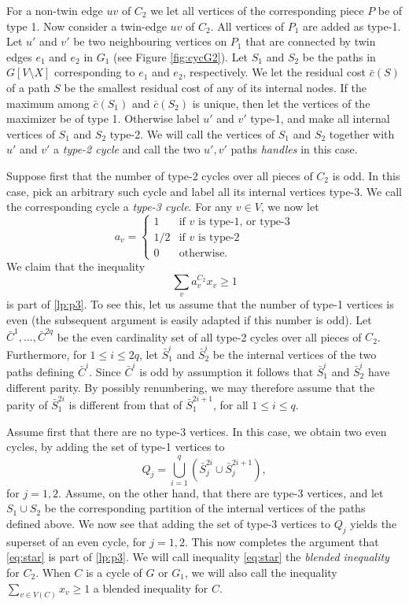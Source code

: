 \documentclass{article}
\newcommand{\0}{\mathbb{0}}
\newcommand{\1}{\mathbb{1}}
\begin{document}
For a non-twin edge
$uv$ of $C_2$ we let all vertices of the corresponding piece $P$ be of type 1. 
Now consider a twin-edge $uv$ of $C_2$. All vertices of $P_1$ are added as type-1. 
Let $u'$ and $v'$ be two neighbouring vertices on $P_1$ that are connected by twin edges 
$e_1$ and $e_2$ in $G_1$ (see Figure \ref{fig:cycG2}). 
Let $S_1$ and
$S_2$ be the paths in $G[V\setminus X]$ corresponding to $e_1$ and
$e_2$, respectively. We let the residual cost $\bar{c}(S)$ of a path $S$ be the
smallest residual cost of any of its internal nodes. 
If the maximum among $\bar{c}(S_1)$ and $\bar{c}(S_2)$ is unique, then let the vertices
of the maximizer be of type 1. Otherwise label $u'$ and $v'$ type-1, and make all internal
vertices of $S_1$ and $S_2$ type-2. We will call the vertices of $S_1$ and $S_2$ together
with $u'$ and $v'$ a {\em type-2 cycle} and call the two $u',v'$ paths \emph{handles} \cite{FJP10} in this case. %

Suppose first that the number of type-2 cycles over all pieces of $C_2$ is
odd. In this case, pick an arbitrary such cycle and label all its internal
vertices type-3. We call the corresponding cycle a {\em type-3 cycle}. For any
$v \in V$, we now let
\[
  a_v = \begin{cases} 
    1 & \mbox{if $v$ is type-1, or type-3}\\
    1/2 & \mbox{if $v$ is type-2}\\
    0 & \mbox{otherwise.}  
    \end{cases}
\]
We claim that the inequality
\begin{equation}\tag{$\circledast$}\label{eq:star} 
  \sum_v a_v^{C_2} x_v \geq 1 
\end{equation}
is part of \eqref{lp:p3}. To see this, let us assume that the number of type-1
vertices is even (the subsequent argument is easily adapted if this number is
odd). Let $\bar{C}^1, \ldots, \bar{C}^{2q}$ be the even cardinality set of all
type-2 cycles over all pieces of $C_2$. Furthermore, for $1 \leq i \leq 2q$,
let $ \bar{S}^i_1$ and $\bar{S}^i_2$ be the internal vertices of the two paths
defining $\bar{C}^i$. Since $\bar{C}^i$ is odd by assumption it follows that
$\bar{S}^i_1$ and $\bar{S}^i_2$ have different parity. By possibly
renumbering, we may therefore assume that the parity of $\bar{S}^{2i}_1$ is
different from that of $\bar{S}^{2i+1}_1$, for all $1 \leq i \leq q$. 

Assume first that there are no type-3 vertices. In this case, we obtain two
even cycles, by adding the set of type-1 vertices to  
\[ Q_j =
\bigcup_{i=1}^q(\bar{S}^{2i}_j \cup \bar{S}^{2i+1}_j), \]  
for $j=1,2$. 
Assume, on the other hand, that there are type-3 vertices, and let $S_1 \cup S_2$ be the
corresponding partition of the internal vertices of the paths defined above. 
We now see that adding the set of type-3 vertices to $Q_j$ yields the superset
of an even cycle, for $j=1,2$. This now completes the argument that \eqref{eq:star} is
part of \ref{lp:p3}.  We will call inequality \ref{eq:star} the \emph{blended inequality} for $C_2$. When $ C$ is a cycle of $G$ or $G_1$, we will also call the inequality $ \sum_{v \in V(C)} x_v \geq 1 $ a blended inequality for $C$.
\end{document}
